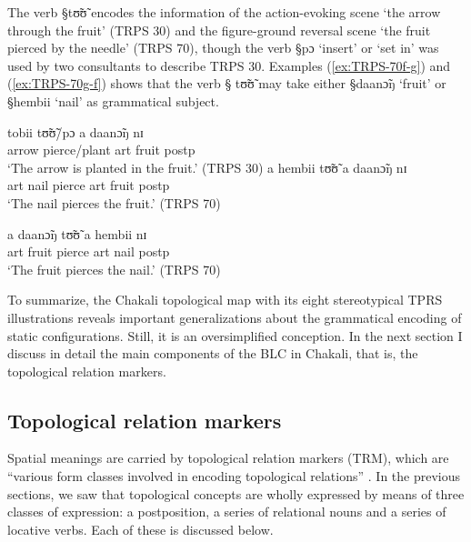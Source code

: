 The verb {\S  tʊ̃ʊ̃} encodes the information of  the action-evoking scene `the
arrow through the fruit' (TRPS 30) and the figure-ground reversal scene  `the
fruit pierced by the needle'  (TRPS 70), though the verb {\S pɔ} `insert' or
`set in' was used by two consultants to describe TRPS 30. Examples 
(\ref{ex:TRPS-70f-g}) and  (\ref{ex:TRPS-70g-f}) shows that the verb  {\S 
tʊ̃ʊ̃} may take either {\S daanɔ̃ŋ}  `fruit' or  {\S hembii} `nail' as
grammatical subject.


 \begin{exe}
 \ex\label{ex:TRPS-30-70}
 \begin{xlist}

 \ex\label{ex:TRPS-30}
 \gll  tobii   tʊ̃ʊ̃/pɔ a daanɔ̃ŋ  nɪ\\
 arrow pierce/plant {\sc art}   fruit {\sc postp}  \\
 \glt `The arrow is planted in the fruit.' (TRPS 30)
 \ex\label{ex:TRPS-70f-g}
 \gll  a hembii   tʊ̃ʊ̃ a daanɔ̃ŋ  nɪ \\
{\sc art} nail pierce {\sc art} fruit {\sc postp}\\
 \glt `The nail pierces the fruit.' (TRPS 70)


 \ex\label{ex:TRPS-70g-f}
 \gll a daanɔ̃ŋ   tʊ̃ʊ̃ a hembii nɪ\\
 {\sc art} fruit pierce   {\sc art} nail {\sc postp} \\
 \glt `The fruit pierces the nail.' (TRPS 70)

 \end{xlist}
 \end{exe}


To summarize, the Chakali topological map with its eight stereotypical TPRS
illustrations reveals important generalizations about the grammatical encoding
of static configurations. Still, it is an oversimplified conception. In the next
section I discuss in detail  the main components of the BLC in Chakali, that
is,  the topological relation markers.



\subsection{Topological relation markers}
\label{sec:SPA-trm}

Spatial meanings  are carried by topological relation markers (TRM), which are
``various form classes involved in encoding topological  relations''
\citep[486]{Levi03b}. In the previous sections, we saw that  topological
concepts are wholly expressed by means of  three classes of
expression:  a postposition, a series of relational nouns and a series of
locative verbs. Each of these is discussed below.



